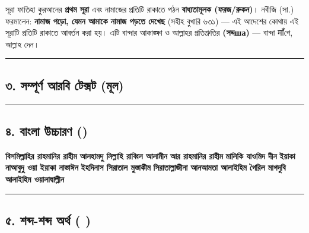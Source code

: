 সূরা ফাতিহা কুরআনের \textbf{প্রথম সূরা} এবং নামাজের প্রতিটি রাকাতে পঠন \textbf{বাধ্যতামূলক (ফরজ/রুকন)}। নবীজি (সা.) ফরমালেন: \textbf{নামাজ পড়ো, যেমন আমাকে নামাজ পড়তে দেখেছ} (সহীহ বুখারি ৬৩১) — এই আদেশের কোথায় এই সূরাটি প্রতিটি রাকাতে আবর্তন করা হয়। এটি বান্দার আকাঙ্ক্ষা ও আল্লাহর প্রতিশ্রুতির \textbf{ (সদ্দша)} — বান্দা माँগে, আল্লাহ দেন।

\medskip\hrule\medskip

\subsection*{৩. সম্পূর্ণ আরবি টেক্সট (মূল)}

\begin{center}\end{center}
\begin{center}\end{center}
\begin{center}\end{center}
\begin{center}\end{center}
\begin{center}\end{center}
\begin{center}\end{center}
\begin{center}\end{center}

\medskip\hrule\medskip

\subsection*{৪. বাংলা উচ্চারণ ()}

\textbf{বিসমিল্লাহির রাহমানির রাহীম}
\textbf{আলহামদু লিল্লাহি রাব্বিল আলামীন}
\textbf{আর রাহমানির রাহীম}
\textbf{মালিকি যাওমিদ দীন}
\textbf{ইয়াকা নাআবুদু ওয়া ইয়াকা নাস্তাঈন}
\textbf{ইহদিনাস সিরাতাল মুস্তাকীম}
\textbf{সিরাতাল্লাজীনা আনআমতা আলাইহিম গৈরিল মাগদুবি আলাইহিম ওয়ালাদ্বাল্লীন}

\medskip\hrule\medskip

\subsection*{৫. শব্দ-শব্দ অর্থ (  )}

